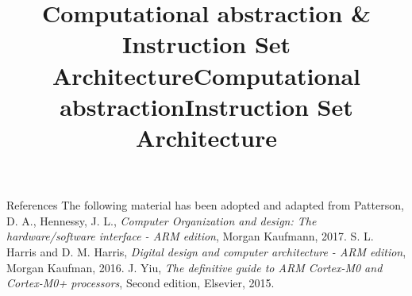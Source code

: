 \documentclass[]{slides}
\title{Computational abstraction \& \\ Instruction Set Architecture}
\begin{document}
\begin{frame} \titlepage \end{frame}


\begin{frame}{References}
The following material has been adopted and adapted from 
\newline
\newline
Patterson, D. A., Hennessy, J. L., \emph{Computer Organization and design: The hardware/software interface - ARM edition}, Morgan Kaufmann, 2017.
\newline
\newline
S. L. Harris and D. M. Harris, \emph{Digital design and computer architecture - ARM edition}, Morgan Kaufman, 2016.
\newline
\newline
J. Yiu, \emph{The definitive guide to ARM Cortex-M0 and Cortex-M0+ processors}, Second edition, Elsevier, 2015.

\end{frame}

\title{Computational abstraction}

\title{Instruction Set Architecture}

\end{document}
